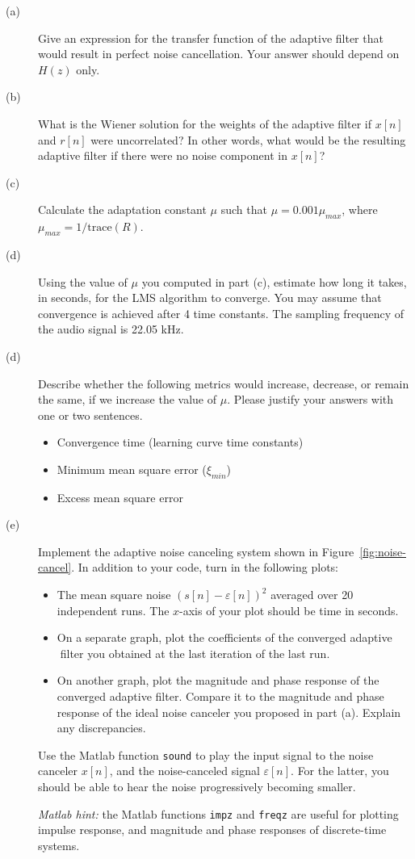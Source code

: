 \documentclass[12pt]{report}
\begin{document}
\begin{description}
	\item [(a)] Give an expression for the transfer function of the adaptive filter that would result in perfect noise cancellation. Your answer should depend on $H(z)$ only.
	\item [(b)] What is the Wiener solution for the weights of the adaptive filter if $x[n]$ and $r[n]$ were uncorrelated? In other words, what would be the resulting adaptive filter if there were no noise component in $x[n]$?
	\item [(c)] Calculate the adaptation constant $\mu$ such that $\mu = 0.001\mu_{max}$, where $\mu_{max} = 1/\mathrm{trace}(R)$.
	\item [(d)] Using the value of $\mu$ you computed in part (c), estimate how long it takes, in seconds, for the LMS algorithm to converge. You may assume that convergence is achieved after 4 time constants. The sampling frequency of the audio signal is 22.05 kHz. 
	\item [(d)] Describe whether the following metrics would increase, decrease, or remain the same, if we increase the value of $\mu$. Please justify your answers with one or two sentences.
	\begin{itemize}
		\item Convergence time (learning curve time constants)
		\item Minimum mean square error ($\xi_{min}$)
		\item Excess mean square error
	\end{itemize}
	\item [(e)] Implement the adaptive noise canceling system shown in Figure~\ref{fig:noise-cancel}. In addition to your code, turn in the following plots: 
	\begin{itemize}
		\item The mean square noise $(s[n] - \varepsilon[n])^2$ averaged over 20 independent runs. The $x$-axis of your plot should be time in seconds.
		\item On a separate graph, plot the coefficients of the converged adaptive filter you obtained at the last iteration of the last run.
		\item On another graph, plot the magnitude and phase response of the converged adaptive filter. Compare it to the magnitude and phase response of the ideal noise canceler you proposed in part (a). Explain any discrepancies.
	\end{itemize}

	Use the Matlab function \texttt{sound} to play the input signal to the noise canceler $x[n]$, and the noise-canceled signal $\varepsilon[n]$. For the latter, you should be able to hear the noise progressively becoming smaller.
	
	\textit{Matlab hint:} the Matlab functions \texttt{impz} and \texttt{freqz} are useful for plotting impulse response, and magnitude and phase responses of discrete-time systems.
	
\end{description}
\end{document}
